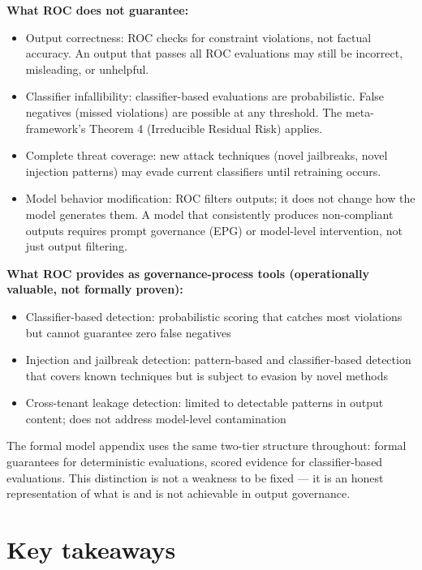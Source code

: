 \textbf{What ROC does not guarantee:}

\begin{itemize}
  \item Output correctness: ROC checks for constraint violations, not factual accuracy. An output that passes all ROC evaluations may still be incorrect, misleading, or unhelpful.
  \item Classifier infallibility: classifier-based evaluations are probabilistic. False negatives (missed violations) are possible at any threshold. The meta-framework's Theorem 4 (Irreducible Residual Risk) applies.
  \item Complete threat coverage: new attack techniques (novel jailbreaks, novel injection patterns) may evade current classifiers until retraining occurs.
  \item Model behavior modification: ROC filters outputs; it does not change how the model generates them. A model that consistently produces non-compliant outputs requires prompt governance (EPG) or model-level intervention, not just output filtering.
\end{itemize}


\textbf{What ROC provides as governance-process tools (operationally valuable, not formally proven):}

\begin{itemize}
  \item Classifier-based detection: probabilistic scoring that catches most violations but cannot guarantee zero false negatives
  \item Injection and jailbreak detection: pattern-based and classifier-based detection that covers known techniques but is subject to evasion by novel methods
  \item Cross-tenant leakage detection: limited to detectable patterns in output content; does not address model-level contamination
\end{itemize}


The formal model appendix uses the same two-tier structure throughout: formal guarantees for deterministic evaluations, scored evidence for classifier-based evaluations. This distinction is not a weakness to be fixed --- it is an honest representation of what is and is not achievable in output governance.



\section{Key takeaways}


